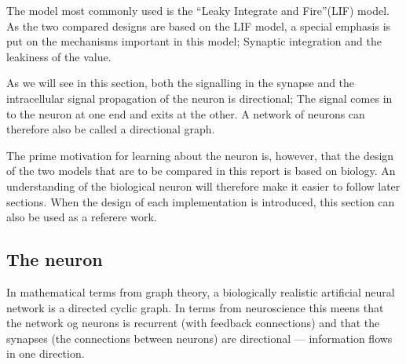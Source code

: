 The model most commonly used is the ``Leaky Integrate and Fire''(LIF) model\cite{florian03}. 
As the two compared designs are based on the LIF model, a special emphasis is put on the mechanisms important in this model; Synaptic integration and the leakiness of the value.

As we will see in this section, both the signalling in the synapse and the intracellular signal propagation of the neuron is directional;
	The signal comes in to the neuron at one end and exits at the other.
A network of neurons can therefore also be called a directional graph.

The prime motivation for learning about the neuron is, however, that the design of the two models that are to be compared in this report is based on biology.
An understanding of the biological neuron will therefore make it easier to follow later sections.
When the design of each implementation is introduced, this section can also be used as a referere work.






\subsection{The neuron}
\label{ssecTheNeuron}
In mathematical terms from graph theory, a biologically realistic artificial neural network is a directed cyclic graph. 
In terms from neuroscience this meens that the network og neurons is recurrent (with feedback connections) and that the synapses (the connections between neurons) are directional --- information flows in one direction. 

